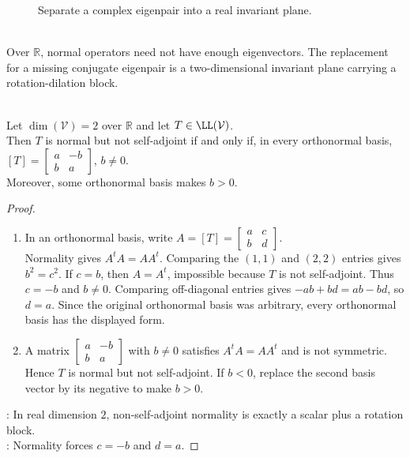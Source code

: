 \begin{figure}[H]
  \centering
  
  \caption{Separate a complex eigenpair into a real invariant plane.}
  \label{fig:real-invariant-plane-from-complex-eigenpair}
\end{figure}

\begin{perspective} \label{per:real-normal-operators-planes} \\
Over $\mathbb{R}$, normal operators need not have enough eigenvectors. The replacement for a missing conjugate eigenpair is a two-dimensional invariant plane carrying a rotation-dilation block.
\end{perspective}

\begin{proposition} \label{prop:two-dimensional-real-normal-block} \\
Let $\dim(\mathcal{V})=2$ over $\mathbb{R}$ and let $T\in\LL(\mathcal{V})$.\\
Then $T$ is normal but not self-adjoint if and only if, in every orthonormal basis, $[T]=
\begin{bmatrix}
a&-b\\
b&a
\end{bmatrix}$, $b\neq0$.\\
Moreover, some orthonormal basis makes $b>0$.
\begin{proof}
\begin{enumerate}[label=\roman*.]
\setlength{\itemsep}{0pt}
\item[$(\Rightarrow)$] In an orthonormal basis, write $A=[T]=
\begin{bmatrix}
a&c\\
b&d
\end{bmatrix}$.\\
Normality gives $A^tA=AA^t$. Comparing the $(1,1)$ and $(2,2)$ entries gives $b^2=c^2$. If $c=b$, then $A=A^t$, impossible because $T$ is not self-adjoint. Thus $c=-b$ and $b\neq0$. Comparing off-diagonal entries gives $-ab+bd=ab-bd$, so $d=a$. Since the original orthonormal basis was arbitrary, every orthonormal basis has the displayed form.
\item[$(\Leftarrow)$] A matrix $\begin{bmatrix}a&-b\\ b&a\end{bmatrix}$ with $b\neq0$ satisfies $A^tA=AA^t$ and is not symmetric. Hence $T$ is normal but not self-adjoint. If $b<0$, replace the second basis vector by its negative to make $b>0$.
\end{enumerate}
: In real dimension $2$, non-self-adjoint normality is exactly a scalar plus a rotation block.\\
: Normality forces $c=-b$ and $d=a$.
\end{proof}
\end{proposition}

